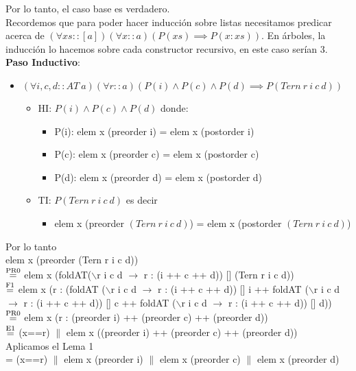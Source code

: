 \documentclass{article}
\begin{document}
Por lo tanto, el caso base es verdadero. \\
Recordemos que para poder hacer inducción sobre listas necesitamos predicar acerca de $(\forall xs::[a])(\forall x ::a) (P(xs) \implies P(x:xs))$. En árboles, la inducción lo hacemos sobre cada constructor recursivo, en este caso serían 3. \\
\textbf{Paso Inductivo}: 
\begin{itemize}
    \item $(\forall i, c, d:: AT \ a)(\forall r::a)(P(i) \land P(c) \land P(d) \implies P(Tern \ r \ i \ c \ d))$
    \begin{itemize}
        \item HI: $P(i) \land P(c) \land P(d)$ donde: 
        \begin{itemize}
            \item P(i): elem x (preorder i) = elem x (postorder i)
            \item P(c): elem x (preorder c) = elem x (postorder c)
            \item P(d): elem x (preorder d) = elem x (postorder d)
        \end{itemize}
        \item TI: $P(Tern \ r \ i \ c \ d)$ es decir
        \begin{itemize}
        \item elem x (preorder $(Tern \ r \ i \ c \ d)$) = elem x (postorder $(Tern \ r \ i \ c \ d)$)
        \end{itemize}
    \end{itemize}
\end{itemize}
Por lo tanto \\ 
elem x (preorder (Tern r i c d)) \\ 
$\stackrel{\text{PR0}}{=}$ elem x (foldAT($\backslash$r i c d $\rightarrow$ r : (i ++ c ++ d)) [] (Tern r i c d)) \\ 
$\stackrel{\text{F1}}{=}$ elem x (r : (foldAT ($\backslash$r i c d $\rightarrow$ r : (i ++ c ++ d)) [] i ++ foldAT ($\backslash$r i c d $\rightarrow$ r : (i ++ c ++ d)) [] c ++ foldAT ($\backslash$r i c d $\rightarrow$ r : (i ++ c ++ d)) [] d)) \\ 
$\stackrel{\text{PR0}}{=}$ elem x (r : (preorder i) ++ (preorder c) ++ (preorder d)) \\
$\stackrel{\text{E1}}{=}$ (x==r) $\|$ elem x ((preorder i) ++ (preorder c) ++ (preorder d)) \\
Aplicamos el Lema 1 \\
= (x==r) $\|$ elem x (preorder i) $\|$ elem x (preorder c) $\|$ elem x (preorder d) \\
\end{document}
